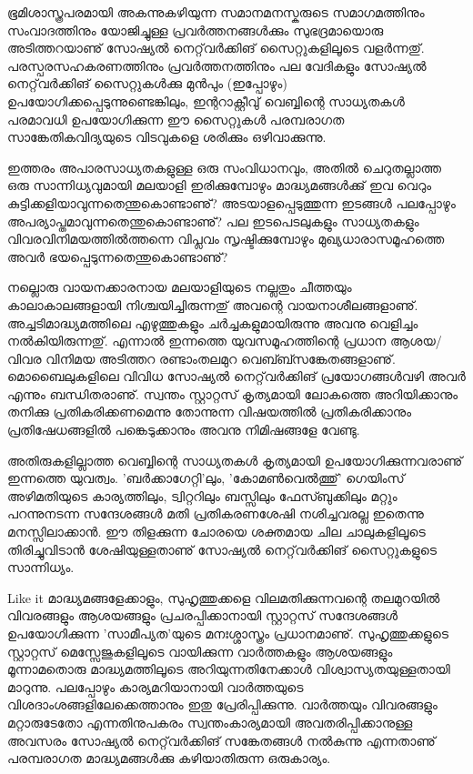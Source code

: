 ഭൂമിശാസ്ത്രപരമായി അകന്നുകഴിയുന്ന സമാനമനസ്കരുടെ സമാഗമത്തിനും സംവാദത്തിനും യോജിച്ചുള്ള പ്രവര്‍ത്തനങ്ങള്‍ക്കും 
സുഭദ്രമായൊരു അടിത്തറയാണു് സോഷ്യല്‍ നെറ്റ്‌വര്‍ക്കിങ് സൈറ്റുകളിലൂടെ വളര്‍ന്നതു്. പരസ്പരസഹകരണത്തിനും 
പ്രവര്‍ത്തനത്തിനും പല വേദികളും സോഷ്യല്‍ നെറ്റ്‌വര്‍ക്കിങ് സൈറ്റുകള്‍ക്കു മുന്‍പും (ഇപ്പോഴും) ഉപയോഗിക്കപ്പെടുന്നുണ്ടെങ്കിലും, 
ഇന്ററാക്റ്റീവു് വെബ്ബിന്റെ സാധ്യതകള്‍ പരമാവധി ഉപയോഗിക്കുന്ന ഈ സൈറ്റുകള്‍ പരമ്പരാഗത സാങ്കേതികവിദ്യയുടെ വിടവുകളെ ശരിക്കും 
ഒഴിവാക്കുന്നു.

ഇത്തരം അപാരസാധ്യതകളുള്ള ഒരു സംവിധാനവും, അതില്‍ ചെറുതല്ലാത്ത ഒരു സാന്നിധ്യവുമായി മലയാളി ഇരിക്കുമ്പോഴും 
മാദ്ധ്യമങ്ങള്‍ക്കു് ഇവ വെറും കുട്ടിക്കളിയാവുന്നതെന്തുകൊണ്ടാണു്? അടയാളപ്പെടുത്തുന്ന ഇടങ്ങള്‍ പലപ്പോഴും 
അപര്യാപ്തമാവുന്നതെന്തുകൊണ്ടാണു്? പല ഇടപെടലുകളും സാധ്യതകളും വിവരവിനിമയത്തില്‍ത്തന്നെ വിപ്ലവം സൃഷ്ടിക്കുമ്പോഴും 
മുഖ്യധാരാസമൂഹത്തെ അവര്‍ ഭയപ്പെടുന്നതെന്തുകൊണ്ടാണു്?

നല്ലൊരു വായനക്കാരനായ മലയാളിയുടെ നല്ലതും ചീത്തയും കാലാകാലങ്ങളായി നിശ്ചയിച്ചിരുന്നതു് അവന്റെ വായനാശീലങ്ങളാണു്.
 അച്ചടിമാദ്ധ്യമത്തിലെ എഴുത്തുകളും ചര്‍ച്ചകളുമായിരുന്നു അവനു വെളിച്ചം നല്‍കിയിരുന്നതു്. എന്നാല്‍ ഇന്നത്തെ 
യുവസമൂഹത്തിന്റെ പ്രധാന ആശയ/വിവര വിനിമയ അടിത്തറ രണ്ടാംതലമുറ വെബ്ബ്സങ്കേതങ്ങളാണു്. മൊബൈലുകളിലെ 
വിവിധ സോഷ്യല്‍ നെറ്റ്‌വര്‍ക്കിങ് പ്രയോഗങ്ങള്‍വഴി അവര്‍ എന്നും ബന്ധിതരാണു്. സ്വന്തം സ്റ്റാറ്റസ് കൃത്യമായി ലോകത്തെ 
അറിയിക്കാനും തനിക്കു പ്രതികരിക്കണമെന്നു തോന്നുന്ന വിഷയത്തില്‍ പ്രതികരിക്കാനും പ്രതിഷേധങ്ങളില്‍ പങ്കെടുക്കാനും അവനു 
നിമിഷങ്ങളേ വേണ്ടു.

അതിരുകളില്ലാത്ത വെബ്ബിന്റെ സാധ്യതകള്‍ കൃത്യമായി ഉപയോഗിക്കുന്നവരാണു് ഇന്നത്തെ യുവത്വം. 'ബര്‍ക്കാഗേറ്റി'ലും, 
'കോമണ്‍വെല്‍ത്തു്' ഗെയിംസ് അഴിമതിയുടെ കാര്യത്തിലും, ട്വിറ്ററിലും ബസ്സിലും ഫേസ്ബുക്കിലും മറ്റും പറന്നുനടന്ന സന്ദേശങ്ങള്‍ 
മതി പ്രതികരണശേഷി നശിച്ചവരല്ല ഇതെന്നു മനസ്സിലാക്കാന്‍. ഈ തിളക്കുന്ന ചോരയെ ശക്തമായ ചില ചാലുകളിലൂടെ തിരിച്ചുവിടാന്‍ 
ശേഷിയുള്ളതാണു് സോഷ്യല്‍ നെറ്റ്‌വര്‍ക്കിങ് സൈറ്റുകളുടെ സാന്നിധ്യം.

Like it മാദ്ധ്യമങ്ങളേക്കാളും, സുഹൃത്തുക്കളെ വിലമതിക്കുന്നവന്റെ തലമുറയില്‍ വിവരങ്ങളും ആശയങ്ങളും പ്രചരപ്പിക്കാനായി 
സ്റ്റാറ്റസ് സന്ദേശങ്ങള്‍ ഉപയോഗിക്കുന്ന 'സാമീപ്യത'യുടെ മനഃശ്ശാസ്ത്രം പ്രധാനമാണു്. സുഹൃത്തുക്കളുടെ സ്റ്റാറ്റസ് മെസ്സേജുകളിലൂടെ 
വായിക്കുന്ന വാര്‍ത്തകളും ആശയങ്ങളും മൂന്നാമതൊരു മാദ്ധ്യമത്തിലൂടെ അറിയുന്നതിനേക്കാള്‍ വിശ്വാസ്യതയുള്ളതായി മാറുന്നു. 
പലപ്പോഴും കാര്യമറിയാനായി വാര്‍ത്തയുടെ വിശദാംശങ്ങളിലേക്കെത്താനും ഇതു പ്രേരിപ്പിക്കുന്നു. വാര്‍ത്തയും വിവരങ്ങളും 
മറ്റാരുടേതോ എന്നതിനുപകരം സ്വന്തംകാര്യമായി അവതരിപ്പിക്കാനുള്ള അവസരം സോഷ്യല്‍ നെറ്റ്‌വര്‍ക്കിങ് സങ്കേതങ്ങള്‍ നല്‍കുന്നു എന്നതാണു് പരമ്പരാഗത
മാദ്ധ്യമങ്ങള്‍ക്കു കഴിയാതിരുന്ന ഒരുകാര്യം. 

